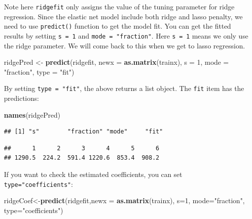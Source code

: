 \documentclass[12pt,]{krantz}
\makeatletter
\newenvironment{Shaded}{\begin{snugshade}}{\end{snugshade}}
\newcommand{\DataTypeTok}[1]{\textcolor[rgb]{0.27,0.27,0.27}{#1}}
\newcommand{\DecValTok}[1]{\textcolor[rgb]{0.06,0.06,0.06}{#1}}
\newcommand{\KeywordTok}[1]{\textcolor[rgb]{0.27,0.27,0.27}{\textbf{#1}}}
\newcommand{\NormalTok}[1]{#1}
\newcommand{\OperatorTok}[1]{\textcolor[rgb]{0.43,0.43,0.43}{\textbf{#1}}}
\newcommand{\StringTok}[1]{\textcolor[rgb]{0.5,0.5,0.5}{#1}}
\newenvironment{kframe}{%
\medskip{}
\setlength{\fboxsep}{.8em}
 \def\at@end@of@kframe{}%
 \ifinner\ifhmode%
  \def\at@end@of@kframe{\end{minipage}}%
  \begin{minipage}{\columnwidth}%
 \fi\fi%
 \def\FrameCommand##1{\hskip\@totalleftmargin \hskip-\fboxsep
 \colorbox{shadecolor}{##1}\hskip-\fboxsep
     \hskip-\linewidth \hskip-\@totalleftmargin \hskip\columnwidth}%
 \MakeFramed {\advance\hsize-\width
   \@totalleftmargin\z@ \linewidth\hsize
   \@setminipage}}%
 {\par\unskip\endMakeFramed%
 \at@end@of@kframe}
\renewenvironment{Shaded}{\begin{kframe}}{\end{kframe}}
\makeatother
\begin{document}
Note here \texttt{ridgefit} only assigns the value of the tuning parameter for ridge regression. Since the elastic net model include both ridge and lasso penalty, we need to use \texttt{predict()} function to get the model fit. You can get the fitted results by setting \texttt{s\ =\ 1} and \texttt{mode\ =\ "fraction"}. Here \texttt{s\ =\ 1} means we only use the ridge parameter. We will come back to this when we get to lasso regression.

\begin{Shaded}
\begin{Highlighting}[]
\NormalTok{ridgePred <-}\StringTok{ }\KeywordTok{predict}\NormalTok{(ridgefit, }\DataTypeTok{newx =} \KeywordTok{as.matrix}\NormalTok{(trainx), }
                     \DataTypeTok{s =} \DecValTok{1}\NormalTok{, }\DataTypeTok{mode =} \StringTok{"fraction"}\NormalTok{, }\DataTypeTok{type =} \StringTok{"fit"}\NormalTok{)}
\end{Highlighting}
\end{Shaded}

By setting \texttt{type\ =\ "fit"}, the above returns a list object. The \texttt{fit} item has the predictions:

\begin{Shaded}
\begin{Highlighting}[]
\KeywordTok{names}\NormalTok{(ridgePred)}
\end{Highlighting}
\end{Shaded}

\begin{verbatim}
## [1] "s"        "fraction" "mode"     "fit"
\end{verbatim}

\begin{Shaded}
\end{Shaded}

\begin{verbatim}
##      1      2      3      4      5      6 
## 1290.5  224.2  591.4 1220.6  853.4  908.2
\end{verbatim}

If you want to check the estimated coefficients, you can set \texttt{type="coefficients"}:

\begin{Shaded}
\begin{Highlighting}[]
\NormalTok{ridgeCoef<-}\KeywordTok{predict}\NormalTok{(ridgefit,}\DataTypeTok{newx =} \KeywordTok{as.matrix}\NormalTok{(trainx), }
                   \DataTypeTok{s=}\DecValTok{1}\NormalTok{, }\DataTypeTok{mode=}\StringTok{"fraction"}\NormalTok{, }\DataTypeTok{type=}\StringTok{"coefficients"}\NormalTok{)}
\end{Highlighting}
\end{Shaded}
\end{document}
